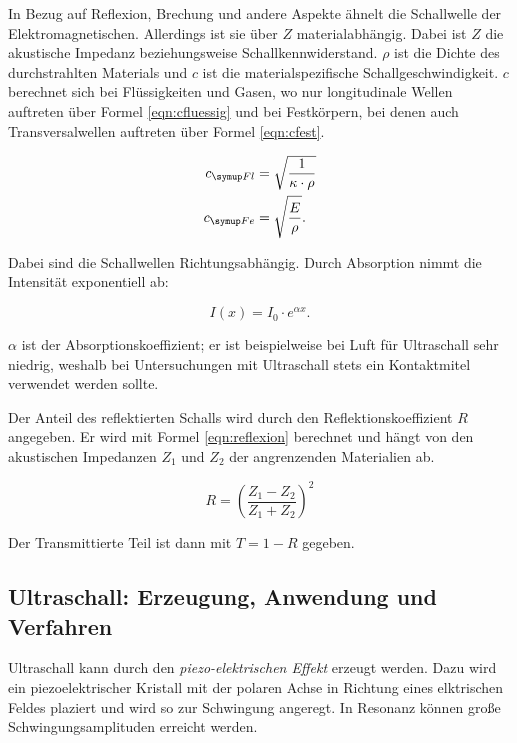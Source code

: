 In Bezug auf Reflexion, Brechung und andere Aspekte ähnelt die Schallwelle der
Elektromagnetischen. Allerdings ist sie über $Z$ materialabhängig.
Dabei ist $Z$ die akustische Impedanz beziehungsweise Schallkennwiderstand. $\rho$
ist die Dichte des durchstrahlten Materials und $c$ ist die materialspezifische Schallgeschwindigkeit.
$c$ berechnet sich bei Flüssigkeiten und Gasen, wo nur longitudinale Wellen auftreten
über Formel \eqref{eqn:cfluessig} und bei Festkörpern, bei denen auch Transversalwellen
auftreten über Formel \eqref{eqn:cfest}.

\begin{align}
  c_{\g{Fl}} &= \sqrt{\frac{1}{\kappa \cdot \rho}} \label{eqn:cfluessig}\\
  c_{\g{Fe}} &= \sqrt{\frac{E}{\rho}} \label{eqn:cfest}.
\end{align}

Dabei sind die Schallwellen Richtungsabhängig. Durch Absorption nimmt die Intensität exponentiell ab:

\begin{equation}
  I(x) = I_0 \cdot e^{\alpha x} .
\end{equation}

$\alpha$ ist der Absorptionskoeffizient; er ist beispielweise bei Luft für Ultraschall sehr
niedrig, weshalb bei Untersuchungen mit Ultraschall stets ein Kontaktmitel verwendet werden sollte.

Der Anteil des reflektierten Schalls wird durch den Reflektionskoeffizient $R$ angegeben.
Er wird mit Formel \eqref{eqn:reflexion} berechnet und hängt von den akustischen Impedanzen
$Z_1$ und $Z_2$ der
angrenzenden Materialien ab.

\begin{equation}
  R = (\frac{Z_1 - Z_2}{Z_1 + Z_2})^2
  \label{eqn:reflexion}
\end{equation}

Der Transmittierte Teil ist dann mit $T=1-R$ gegeben.

\subsection{Ultraschall: Erzeugung, Anwendung und Verfahren}

Ultraschall kann durch den \emph{piezo-elektrischen Effekt} erzeugt werden. Dazu wird ein piezoelektrischer
Kristall mit der polaren Achse in Richtung eines elktrischen Feldes plaziert und wird so zur Schwingung
angeregt. In Resonanz können große Schwingungsamplituden erreicht werden.

